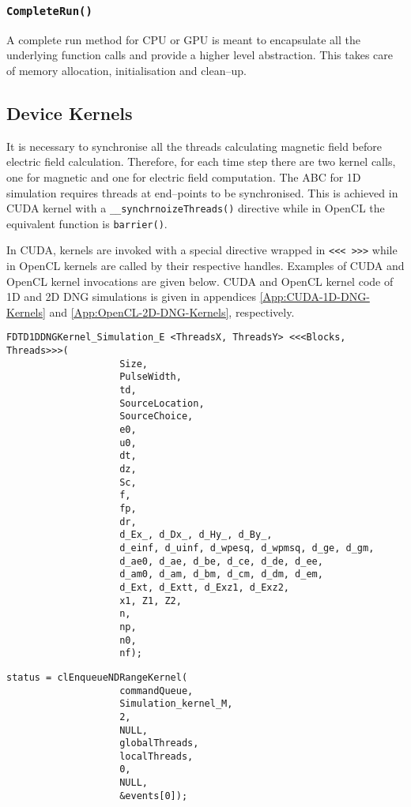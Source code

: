 \subsubsection{\texttt{CompleteRun()}}
A complete run method for CPU or GPU is meant to encapsulate all the underlying function calls and provide a higher level abstraction. This takes care of memory allocation, initialisation and clean--up.
\subsection{Device Kernels}
It is necessary to synchronise all the threads calculating magnetic field before electric field calculation. Therefore, for each time step there are two kernel calls, one for magnetic and one for electric field computation. The ABC for 1D simulation requires threads at end--points to be synchronised. This is achieved in CUDA kernel with a \verb|__synchrnoizeThreads()| directive while in OpenCL the equivalent function is \verb|barrier()|.

In CUDA, kernels are invoked with a special directive wrapped in \verb|<<< >>>| while in OpenCL kernels are called by their respective handles. Examples of CUDA and OpenCL kernel invocations are given below. CUDA and OpenCL kernel code of 1D and 2D DNG simulations is given in appendices \ref{App:CUDA-1D-DNG-Kernels} and \ref{App:OpenCL-2D-DNG-Kernels}, respectively.

\label{lst:CUDA-Kernel-Call}
\SingleSpacing
\begin{lstlisting}[caption={CUDA Kernel Call}]
FDTD1DDNGKernel_Simulation_E <ThreadsX, ThreadsY> <<<Blocks, Threads>>>(
					Size,
					PulseWidth,
					td,
					SourceLocation,
					SourceChoice,
					e0,
					u0,
					dt,
					dz,
					Sc,
					f,
					fp,
					dr,
					d_Ex_, d_Dx_, d_Hy_, d_By_,
					d_einf, d_uinf, d_wpesq, d_wpmsq, d_ge, d_gm,
					d_ae0, d_ae, d_be, d_ce, d_de, d_ee,
					d_am0, d_am, d_bm, d_cm, d_dm, d_em,
					d_Ext, d_Extt, d_Exz1, d_Exz2,
					x1, Z1, Z2,
					n,
					np,
					n0,
					nf);
\end{lstlisting}
\DoubleSpacing

\label{lst:OpenCL-Kernel-Call}
\SingleSpacing
\begin{lstlisting}[caption={OpenCL Kernel Call}]
status = clEnqueueNDRangeKernel(
					commandQueue,
					Simulation_kernel_M,
					2,
					NULL,
					globalThreads,
					localThreads,
					0,
					NULL,
					&events[0]);
\end{lstlisting}
\DoubleSpacing
